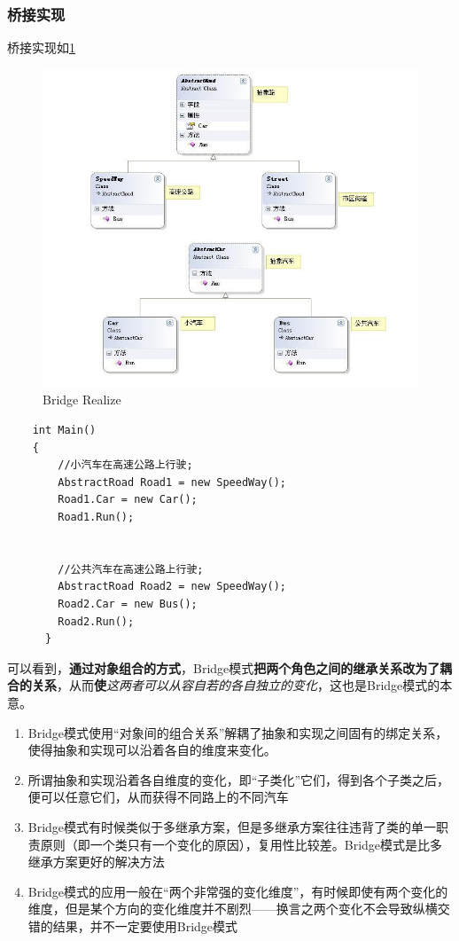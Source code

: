 \documentclass[UTF8,a4paper,12pt]{ctexbook}
\begin{document}
		\subsubsection{桥接实现}
		桥接实现如\ref{Bridge2}
		\begin{figure}[h]
			\centering
			\includegraphics[scale= 0.8]{Bridge2.jpg}
			\caption{Bridge Realize}
			\label{Bridge2}
		\end{figure}
\begin{lstlisting}
	int Main()
	{
        //小汽车在高速公路上行驶;
        AbstractRoad Road1 = new SpeedWay();
	    Road1.Car = new Car();
	    Road1.Run();

	
	    //公共汽车在高速公路上行驶;
	    AbstractRoad Road2 = new SpeedWay();
	    Road2.Car = new Bus();
	    Road2.Run();
      }
\end{lstlisting}
		可以看到，\textbf{通过对象组合的方式}，Bridge模式\textbf{把两个角色之间的继承关系改为了耦合的关系}，从而\textbf{使}\textit{这两者可以从容自若的各自独立的变化}，这也是Bridge模式的本意。	
		\begin{enumerate}
			\item Bridge模式使用“对象间的组合关系”解耦了抽象和实现之间固有的绑定关系，使得抽象和实现可以沿着各自的维度来变化。
			\item 所谓抽象和实现沿着各自维度的变化，即“子类化”它们，得到各个子类之后，便可以任意它们，从而获得不同路上的不同汽车
			\item Bridge模式有时候类似于多继承方案，但是多继承方案往往违背了类的单一职责原则（即一个类只有一个变化的原因），复用性比较差。Bridge模式是比多继承方案更好的解决方法
			\item Bridge模式的应用一般在“两个非常强的变化维度”，有时候即使有两个变化的维度，但是某个方向的变化维度并不剧烈——换言之两个变化不会导致纵横交错的结果，并不一定要使用Bridge模式
		\end{enumerate}
\end{document}
